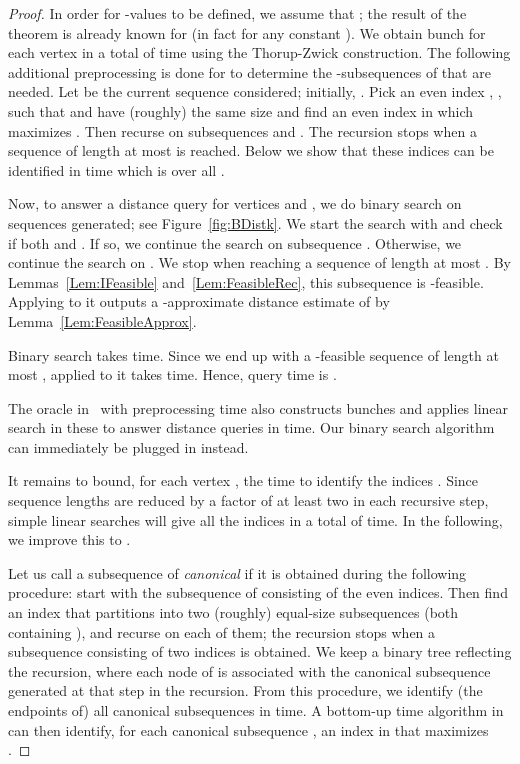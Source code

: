 \documentclass[11pt]{article}
\begin{document}
\begin{proof}
In order for -values to be defined, we assume that
; the result of the theorem is already known for  (in fact
for any constant ).
We obtain bunch  for each vertex  in a total of  time using the Thorup-Zwick construction.
The following additional preprocessing is done for  to determine the -subsequences of  that are needed. Let
 be the current sequence considered; initially, . Pick an even index
, , such that  and  have (roughly) the same size and
find an even index  in  which maximizes . Then recurse on subsequences
 and . The recursion stops when a sequence of length at most   is reached.
Below we show that these indices  can be identified in  time which is  over all .

Now, to answer a distance query for vertices  and , we do binary search on sequences
 generated; see Figure~\ref{fig:BDistk}. We start the search with  and check if
both  and . If so, we continue the search on subsequence .
Otherwise, we continue the search on . We stop when reaching a sequence of length at most .
By Lemmas~\ref{Lem:IFeasible} and~\ref{Lem:FeasibleRec}, this subsequence is -feasible.
Applying  to it outputs a -approximate distance estimate of  by
Lemma~\ref{Lem:FeasibleApprox}.

Binary search takes  time. Since we end up with a -feasible sequence of length at most , 
applied to it takes  time. Hence, query time is .

The oracle in~\cite{SubquadraticOracleCWN} with  preprocessing time
also constructs bunches and applies linear search in these to answer distance
queries in  time. Our binary search algorithm can immediately be plugged in instead.

It remains to bound, for each vertex , the time to identify the indices . Since sequence lengths are reduced by a factor of at least two in each
recursive step, simple linear searches will give all the indices in a total of  time. In the following, we improve this to .

Let us call a subsequence of  \emph{canonical} if it is obtained during the following procedure: start with the subsequence
 of  consisting of the even indices. Then find an index  that partitions  into two
(roughly) equal-size subsequences (both containing ), and recurse on each of
them; the recursion stops when a subsequence consisting of two indices is obtained. We keep a binary tree  reflecting the recursion,
where each node of  is associated with the canonical subsequence generated at that step in the recursion.
From this procedure, we identify (the endpoints of) all canonical subsequences in  time.
A bottom-up  time algorithm in  can then identify, for each canonical subsequence , an
index  in  that maximizes .


\end{proof}
\end{document}
